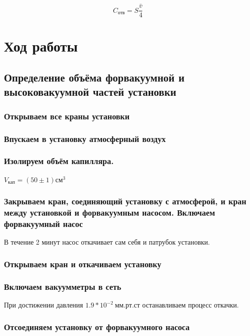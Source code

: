 \documentclass[a4paper, 12pt]{article}
\begin{document}
    \begin{equation}
    C_{отв}=S\frac{\bar v}{4}
    \end{equation}

    \section{Ход работы}
    \subsection{Определение объёма форвакуумной и высоковакуумной частей установки}
        \subsubsection{Открываем все краны установки}

        \subsubsection{Впускаем в установку атмосферный воздух}

        \subsubsection{Изолируем объём капилляра.}

            $V_{кап} = (50 \pm 1) см^3$

        \subsubsection{Закрываем кран, соединяющий установку с атмосферой, и кран между установкой и форвакуумным насосом. Включаем форвакуумный насос}

            В течение 2 минут насос откачивает сам себя и патрубок установки.

        \subsubsection{Открываем кран и откачиваем установку}

        \subsubsection{Включаем вакуумметры в сеть}

            При достижении давления $ 1.9*10^{-2}~мм.рт.ст $ останавливаем процесс откачки.

        \subsubsection{Отсоединяем установку от форвакуумного насоса}
\end{document}

